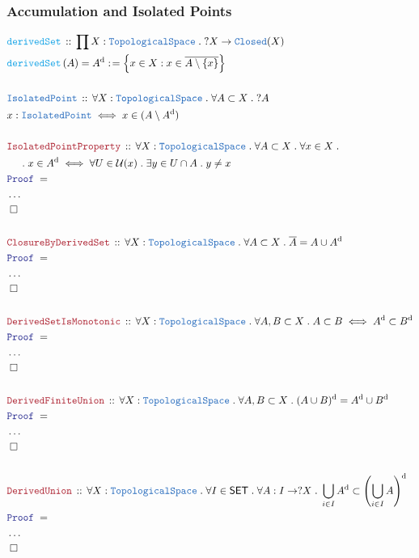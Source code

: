 \documentclass[12pt]{scrartcl}
\newcommand{\TYPE}[1]{\textcolor{NavyBlue}{\mathtt{#1}}}
\newcommand{\FUNC}[1]{\textcolor{Cerulean}{\mathtt{#1}}}
\newcommand{\LOGIC}[1]{\textcolor{Blue}{\mathtt{#1}}}
\newcommand{\THM}[1]{\textcolor{Maroon}{\mathtt{#1}}}
\renewcommand{\.}{\; . \;}
\newcommand{\de}{: \kern 0.1pc =}
\newcommand{\Act}[1]{\left( #1 \right)}
\newcommand{\Theorem}[2]{& \THM{#1} \, :: \, #2 \\ & \Proof = \\ }
\newcommand{\DeclareType}[2]{& \TYPE{#1} \, :: \, #2 \\}
\newcommand{\DefineType}[3]{& #1 : \TYPE{#2} \iff #3 \\}
\newcommand{\DeclareFunc}[2]{& \FUNC{#1} \, :: \, #2 \\}
\newcommand{\DefineNamedFunc}[4]{&  \FUNC{#1}\Act{#2} = #3 \de #4 \\}
\newcommand{\NewLine}{\\ & \kern 1pc}
\newcommand{\Page}[1]{ \begin{align*} #1 \end{align*}   }
\newcommand{\NoProof}{ & \ldots \\ \EndProof}
\newcommand{\QED}{\; \square}
\newcommand{\EndProof}{& \QED \\}
\newcommand{\Proof}{\LOGIC{Proof} \; }
\newcommand{\SET}{\mathsf{SET}}
\newcommand{\TS}{\TYPE{TopologicalSpace}}
\newcommand{\U}{\mathcal{U}}
\renewcommand{\d}{\mathrm{d}}
\begin{document}
\subsubsection{Accumulation and Isolated Points}
\Page{
	\DeclareFunc{derivedSet}
	{
		\prod X : \TS \. 
		?X \to \TYPE{Closed}(X)
	}
	\DefineNamedFunc{derivedSet}{A}{A^\d}
	{ \Big\{ x \in X : 
		 x \in \overline{A \setminus \{x\}}   \Big\}  }
	\\
	\DeclareType{IsolatedPoint}
	{
		\forall X : \TS \.
		\forall A \subset X \.
		?A
	}
	\DefineType{x}{IsolatedPoint}
	{
		x \in (A \setminus A^\d)
	}
	\\
	\Theorem{IsolatedPointProperty}
	{
		\forall X : \TS \.
		\forall A \subset X \.
		\forall x \in X \.
		\NewLine \. 
		x  \in A^\d 
		\iff
		\forall U \in \U(x) \.
		\exists  y \in U \cap A \.
		y \neq x
	}
	\NoProof
	\\
	\Theorem{ClosureByDerivedSet}
	{
		\forall X : \TS \.
		\forall A \subset X \.
		\overline{A} = A \cup A^{\d}
	}
	\NoProof
	\\
	\Theorem{DerivedSetIsMonotonic}
	{
		\forall X  : \TS \.
		\forall A,B \subset X \. 
		A \subset B \iff A^{\d} \subset B^{\d}
	}
	\NoProof
	\\
	\Theorem{DerivedFiniteUnion}
	{
		\forall X : \TS \.
		\forall A,B \subset X \.
		(A \cup B)^\d = A^\d \cup B^\d
	}
	\NoProof
	\\
	\Theorem{DerivedUnion}
	{
		\forall X : \TS \.
		\forall I \in \SET \.
		\forall A : I \to ?X \.
		\bigcup_{i \in I} A^\d \subset 
		\left( \bigcup_{i \in I} A \right)^\d
	}
	\NoProof
}
\newpage
\end{document}
